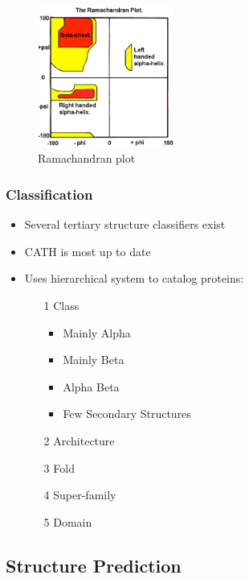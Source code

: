 \documentclass[a4paper]{article}
\begin{document}
\begin{figure}[h!]
  \centering
  \includegraphics[width=0.4\textwidth]{graphics/ramachandran_plot.eps}
  \caption{Ramachandran plot}
  \label{fig:ramachandran_plot}
\end{figure}
\FloatBarrier

\subsubsection{Classification}

\begin{itemize}
  \item
    Several tertiary structure classifiers exist

  \item
    CATH is most up to date

  \item
    Uses hierarchical system to catalog proteins:

    \begin{enumerate}
      \item[1] Class
        \begin{itemize}
          \item Mainly Alpha
          \item Mainly Beta
          \item Alpha Beta
          \item Few Secondary Structures
        \end{itemize}

      \item[2] Architecture
      \item[3] Fold
      \item[4] Super-family
      \item[5] Domain
    \end{enumerate}
\end{itemize}

\subsection{Structure Prediction}
\end{document}
